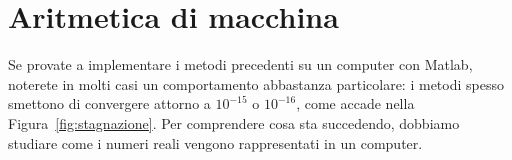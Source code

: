 \documentclass[a4paper]{report}
\DeclarePairedDelimiter{\abs}{\lvert}{\rvert}
\theoremstyle{definition}
\theoremstyle{remark}
\begin{document}

\chapter{Aritmetica di macchina}

Se provate a implementare i metodi precedenti su un computer con Matlab, noterete in molti casi un comportamento abbastanza particolare: i metodi spesso smettono di convergere attorno a $10^{-15}$ o $10^{-16}$, come accade nella Figura~\ref{fig:stagnazione}. Per comprendere cosa sta succedendo, dobbiamo studiare come i numeri reali vengono rappresentati in un computer.
\end{document}
